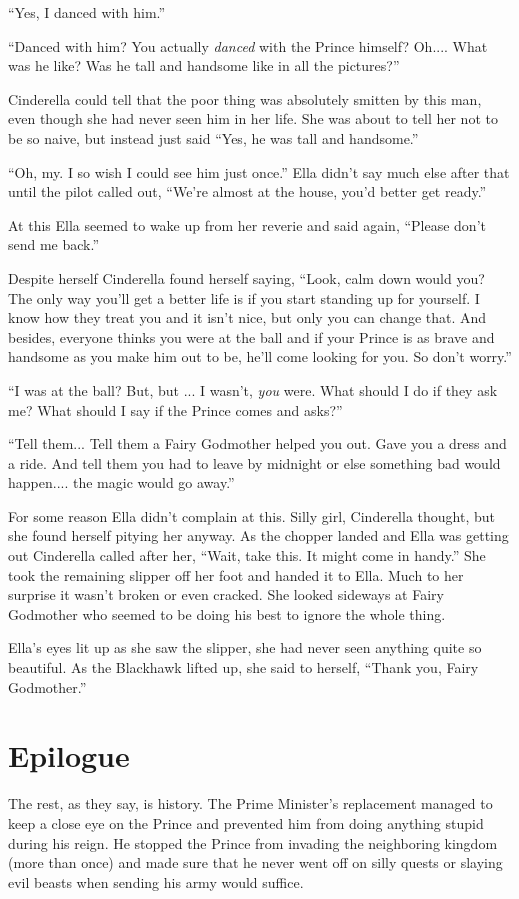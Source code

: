\documentclass[12pt,letterpaper]{article}
\begin{document}
``Yes, I danced with him.''

``Danced with him? You actually \textit{danced} with the Prince himself? Oh.... What was he like? Was he tall and handsome like in all the pictures?''

Cinderella could tell that the poor thing was absolutely smitten by this man, even though she had never seen him in her life. She was about to tell her not to be so naive, but instead just said ``Yes, he was tall and handsome.''

``Oh, my. I so wish I could see him just once.'' Ella didn't say much else after that until the pilot called out, ``We're almost at the house, you'd better get ready.''

At this Ella seemed to wake up from her reverie and said again, ``Please don't send me back.''

Despite herself Cinderella found herself saying, ``Look, calm down would you? The only way you'll get a better life is if you start standing up for yourself. I know how they treat you and it isn't nice, but only you can change that.  And besides, everyone thinks you were at the ball and if your Prince is as brave and handsome as you make him out to be, he'll come looking for you. So don't worry.''

``I was at the ball? But, but ... I wasn't, \textit{you} were. What should I do if they ask me? What should I say if the Prince comes and asks?''

``Tell them... Tell them a Fairy Godmother helped you out. Gave you a dress and a ride. And tell them you had to leave by midnight or else something bad would happen.... the magic would go away.''

For some reason Ella didn't complain at this. Silly girl, Cinderella thought, but she found herself pitying her anyway. As the chopper landed and Ella was getting out Cinderella called after her, ``Wait, take this. It might come in handy.'' She took the remaining slipper off her foot and handed it to Ella. Much to her surprise it wasn't broken or even cracked. She looked sideways at Fairy Godmother who seemed to be doing his best to ignore the whole thing. 

Ella's eyes lit up as she saw the slipper, she had never seen anything quite so beautiful. As the Blackhawk lifted up, she said to herself, ``Thank you, Fairy Godmother.''

\section*{Epilogue}
The rest, as they say, is history. The Prime Minister's replacement managed to keep a close eye on the Prince and prevented him from doing anything stupid during his reign. He stopped the Prince from invading the neighboring kingdom (more than once) and made sure that he never went off on silly quests or slaying evil beasts when sending his army would suffice. 
\end{document}
